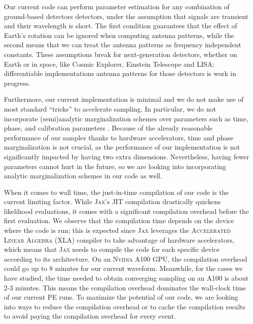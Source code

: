 \documentclass[twocolumn]{aastex631}
\begin{document}
Our current code can perform parameter estimation for any combination of
ground-based detectors detectors, under the assumption that signals are
transient and their wavelength is short. The first condition guarantees that
the effect of Earth's rotation can be ignored when computing antenna patterns,
while the second means that we can treat the antenna patterns as frequency
independent constants. These assumptions break for next-generation detectors,
whether on Earth or in space, like Cosmic Explorer, Einstein Telescope and
LISA; differentiable implementations antenna patterns for those detectors is
work in progress.

Furthermore, our current implementation is minimal and we do not make use of
most standard ``tricks'' to accelerate sampling.  In particular, we do not
incorporate (semi)analytic marginalization schemes over parameters such as
time, phase, and calibration parameters \cite{2019PASA...36...10T}. Because of
the already reasonable performance of our sampler thanks to hardware
accelerators, time and phase marginalization is not crucial, as the performance
of our implementation is not significantly impacted by having two extra
dimensions. Nevertheless, having fewer parameters cannot hurt in the future, so
we are looking into incorporating analytic marginalization schemes in our code
as well.

When it comes to wall time, the just-in-time compilation of our code is the
current limiting factor.  While \textsc{Jax}'s JIT compilation drastically
quickens likelihood evaluations, it comes with a significant compilation
overhead before the first evaluation. We observe that the compilation time
depends on the device where the code is run; this is expected since
\textsc{Jax} leverages the \textsc{Accelerated Linear Algebra} (XLA) compiler
to take advantage of hardware accelerators, which means that \textsc{Jax} needs
to compile the code for each specific device according to its architecture. On
an \textsc{Nvidia} A100 GPU, the compilation overhead could go up to 8 minutes
for our current waveform. Meanwhile, for the cases we have studied, the time
needed to obtain converging sampling on an A100 is about 2-3 minutes. This
means the compilation overhead dominates the wall-clock time of our current PE
runs. To maximize the potential of our code, we are looking into ways to reduce
the compilation overhead or to cache the compilation results to avoid paying
the compilation overhead for every event.
\end{document}
